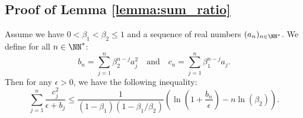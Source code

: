 \documentclass[11pt, letterpaper]{article}
\begin{document}
\subsection{Proof of Lemma \ref{lemma:sum_ratio}}
\begin{lemma}
\label{lemma:sum_ratio}
Assume we have $0 < \beta_1 < \beta_2 \leq 1$ and a sequence of real numbers $(a_n)_{n\in \NN^*}$. We define for all $n \in \NN^*$:
$$b_n = \sum_{j=1}^n \beta_2^{n - j} a_j^2 \quad \text{and} \quad c_n = \sum_{j=1}^n \beta_1^{n-j} a_j.$$
Then for any $\epsilon > 0$, we have the following inequality:
\begin{equation}
    \label{eq:sum_ratio_combined_lemma7}
    \sum_{j=1}^n \frac{c_j^2}{\epsilon + b_j} \leq
    \frac{1}{(1 - \beta_1)(1 - \beta_1 / \beta_2)} \left(\ln\left(1 + \frac{b_n}{\epsilon}\right) - n\ln(\beta_2)\right).
\end{equation}
\end{lemma}
\end{document}
